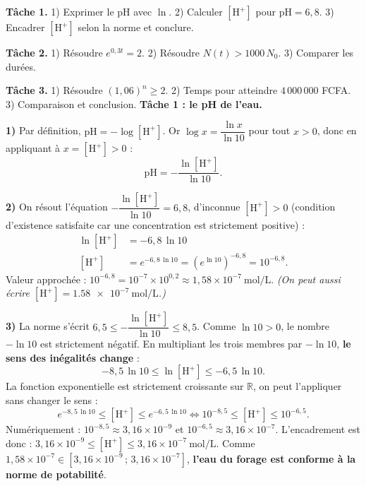 \documentclass[11pt]{article}
\begin{document}
\begin{exoresolu}
\textbf{Tâche 1.} 1) Exprimer le pH avec $\ln$. 2) Calculer $\left[\mathrm{H}^{+}\right]$ pour $\mathrm{pH} = 6{,}8$. 3) Encadrer $\left[\mathrm{H}^{+}\right]$ selon la norme et conclure.

\textbf{Tâche 2.} 1) Résoudre $e^{0{,}3t} = 2$. 2) Résoudre $N(t) > 1000\,N_0$. 3) Comparer les durées.

\textbf{Tâche 3.} 1) Résoudre $(1{,}06)^n \geq 2$. 2) Temps pour atteindre $4\,000\,000$ FCFA. 3) Comparaison et conclusion.
\tcblower
\textbf{Tâche 1 : le pH de l'eau.}

\textbf{1)} Par définition, $\mathrm{pH} = -\log\left[\mathrm{H}^{+}\right]$. Or $\log x = \dfrac{\ln x}{\ln 10}$ pour tout $x > 0$, donc en appliquant à $x = \left[\mathrm{H}^{+}\right] > 0$ :
\[ \mathrm{pH} = -\frac{\ln\left[\mathrm{H}^{+}\right]}{\ln 10}. \]

\textbf{2)} On résout l'équation $-\dfrac{\ln\left[\mathrm{H}^{+}\right]}{\ln 10} = 6{,}8$, d'inconnue $\left[\mathrm{H}^{+}\right] > 0$ (condition d'existence satisfaite car une concentration est strictement positive) :
\begin{align*}
\ln\left[\mathrm{H}^{+}\right] &= -6{,}8\,\ln 10 \\
\left[\mathrm{H}^{+}\right] &= e^{-6{,}8\,\ln 10} = \left(e^{\ln 10}\right)^{-6{,}8} = 10^{-6{,}8}.
\end{align*}
Valeur approchée : $10^{-6{,}8} = 10^{-7} \times 10^{0{,}2} \approx 1{,}58 \times 10^{-7}\ \text{mol/L}$.
\emph{(On peut aussi écrire $\left[\mathrm{H}^{+}\right] = \num{1,58e-7}\ \text{mol/L}$.)}

\textbf{3)} La norme s'écrit $6{,}5 \leq -\dfrac{\ln\left[\mathrm{H}^{+}\right]}{\ln 10} \leq 8{,}5$.
Comme $\ln 10 > 0$, le nombre $-\ln 10$ est strictement négatif. En multipliant les trois membres par $-\ln 10$, \textbf{le sens des inégalités change} :
\[ -8{,}5\,\ln 10 \leq \ln\left[\mathrm{H}^{+}\right] \leq -6{,}5\,\ln 10. \]
La fonction exponentielle est strictement croissante sur $\mathbb{R}$, on peut l'appliquer sans changer le sens :
\[ e^{-8{,}5\,\ln 10} \leq \left[\mathrm{H}^{+}\right] \leq e^{-6{,}5\,\ln 10} \iff 10^{-8{,}5} \leq \left[\mathrm{H}^{+}\right] \leq 10^{-6{,}5}. \]
Numériquement : $10^{-8{,}5} \approx 3{,}16 \times 10^{-9}$ et $10^{-6{,}5} \approx 3{,}16 \times 10^{-7}$.
L'encadrement est donc : $\boxed{3{,}16 \times 10^{-9} \leq \left[\mathrm{H}^{+}\right] \leq 3{,}16 \times 10^{-7}\ \text{mol/L}}$.
Comme $1{,}58 \times 10^{-7} \in \left[3{,}16 \times 10^{-9}\,;\,3{,}16 \times 10^{-7}\right]$, \textbf{l'eau du forage est conforme à la norme de potabilité}.


\end{exoresolu}
\end{document}
